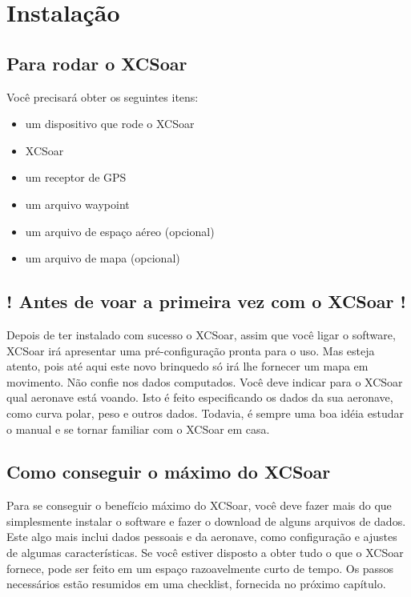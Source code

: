 \chapter{Instalação}\label{cha:installation}

\section{Para rodar o XCSoar}
Você precisará obter os seguintes itens:

\begin{itemize}
\itemsep0em
\item um dispositivo que rode o XCSoar
\item XCSoar
\item um receptor de GPS
\item um arquivo waypoint 
\item um arquivo de espaço aéreo (opcional)
\item um arquivo de mapa (opcional)
\end{itemize}

\section{! Antes de voar a primeira vez com o XCSoar !}

Depois de ter instalado com sucesso o XCSoar, assim que você ligar o software, XCSoar irá apresentar uma pré-configuração pronta para o uso.  Mas esteja atento, pois até aqui este novo brinquedo só irá lhe fornecer um mapa em movimento.  Não confie nos dados computados.  Você deve indicar para o XCSoar qual aeronave está voando.  Isto é feito especificando os dados da sua aeronave, como curva polar, peso e outros dados.  Todavia, é sempre uma boa idéia estudar o manual e se tornar familiar com o XCSoar em casa.

\section{Como conseguir o máximo do XCSoar}

Para se conseguir o benefício máximo do XCSoar, você deve fazer mais do que simplesmente instalar o software e fazer o download de alguns arquivos de dados.  Este algo mais inclui dados pessoais e da aeronave, como configuração e ajustes de algumas características.  Se você estiver disposto a obter tudo o que o XCSoar fornece, pode ser feito em um espaço razoavelmente curto de tempo.  Os passos necessários estão resumidos em uma checklist, fornecida no próximo capítulo.

